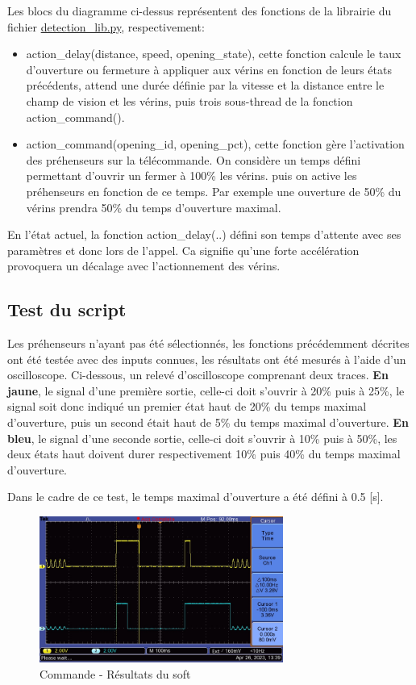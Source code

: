 Les blocs du diagramme ci-dessus représentent des fonctions de la librairie du fichier \underline{detection\_lib.py}, respectivement:
\begin{itemize}
    \item action\_delay(distance, speed, opening\_state), cette fonction calcule le taux d'ouverture ou fermeture à appliquer aux vérins en fonction de leurs états précédents,
          attend une durée définie par la vitesse et la distance entre le champ de vision et les vérins, puis trois sous-thread de la fonction action\_command().
    \item action\_command(opening\_id, opening\_pct), cette fonction gère l'activation des préhenseurs sur la télécommande. On considère un temps défini permettant d'ouvrir un fermer à 100\% les vérins.
          puis on active les préhenseurs en fonction de ce temps. Par exemple une ouverture de 50\% du vérins prendra 50\% du temps d'ouverture maximal.
\end{itemize}
En l'état actuel, la fonction action\_delay(..) défini son temps d'attente avec ses paramètres et donc lors de l'appel. Ca signifie qu'une forte accélération provoquera un décalage avec l'actionnement des vérins.
\subsection{Test du script}
Les préhenseurs n'ayant pas été sélectionnés, les fonctions précédemment décrites ont été testée avec des inputs connues, les résultats ont été mesurés
à l'aide d'un oscilloscope.
\newpage
Ci-dessous, un relevé d'oscilloscope comprenant deux traces. \textbf{En jaune}, le signal d'une première sortie, celle-ci doit s'ouvrir à 20\% puis à 25\%,
le signal soit donc indiqué un premier état haut de 20\% du temps maximal d'ouverture, puis un second était haut de 5\% du temps maximal d'ouverture.
\textbf{En bleu}, le signal d'une seconde sortie, celle-ci doit s'ouvrir à 10\% puis à 50\%, les deux états haut doivent durer respectivement 10\% puis 40\% du temps maximal d'ouverture.

Dans le cadre de ce test, le temps maximal d'ouverture a été défini à 0.5 [s].
\begin{figure}[H]
    \centering
    \includegraphics[width=8cm, angle=-90]{assets/figures/oscillo_commande.JPG}
    \caption{Commande - Résultats du soft}
\end{figure}

